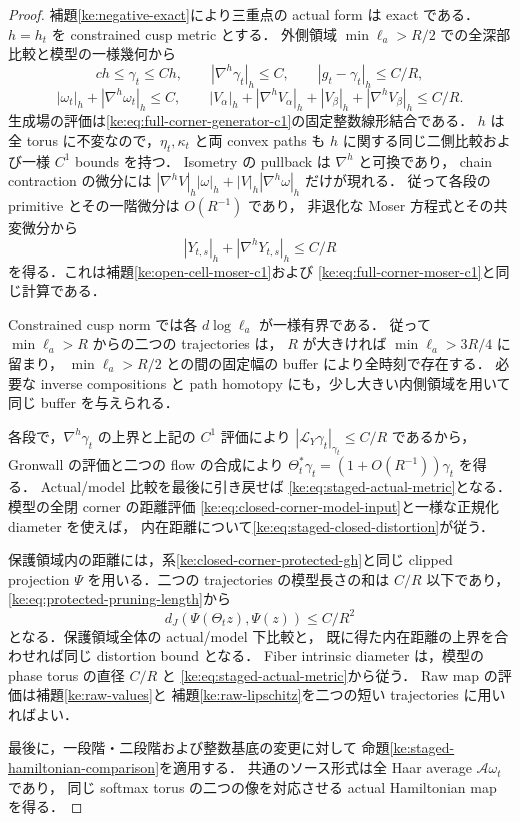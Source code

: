 \begin{proof}
補題\ref{ke:negative-exact}により三重点の actual form は exact である．
$h=h_t$ を constrained cusp metric とする．
外側領域 $\min\ell_a>R/2$ での全深部比較と模型の一様幾何から
\[
 ch\le\gamma_t\le Ch,\qquad
 |\nabla^h\gamma_t|_h\le C,\qquad |g_t-\gamma_t|_h\le C/R,
\]
\[
 |\omega_t|_h+|\nabla^h\omega_t|_h\le C,\qquad
 |V_\alpha|_h+|\nabla^hV_\alpha|_h
 +|V_\beta|_h+|\nabla^hV_\beta|_h
 \le C/R.
\]
生成場の評価は\eqref{ke:eq:full-corner-generator-c1}の固定整数線形結合である．
$h$ は全 torus に不変なので，$\eta_t,\kappa_t$ と両 convex paths も
$h$ に関する同じ二側比較および一様 $C^1$ bounds を持つ．
Isometry の pullback は $\nabla^h$ と可換であり，
chain contraction の微分には
$|\nabla^hV|_h|\omega|_h+|V|_h|\nabla^h\omega|_h$ だけが現れる．
従って各段の primitive とその一階微分は $O(R^{-1})$ であり，
非退化な Moser 方程式とその共変微分から
\[
 |Y_{t,s}|_h+|\nabla^hY_{t,s}|_h
 \le C/R
\]
を得る．これは補題\ref{ke:open-cell-moser-c1}および
\eqref{ke:eq:full-corner-moser-c1}と同じ計算である．

Constrained cusp norm では各 $d\log\ell_a$ が一様有界である．
従って $\min\ell_a>R$ からの二つの trajectories は，
$R$ が大きければ $\min\ell_a>3R/4$ に留まり，
$\min\ell_a>R/2$ との間の固定幅の buffer により全時刻で存在する．
必要な inverse compositions と path homotopy にも，少し大きい内側領域を用いて
同じ buffer を与えられる．

各段で，$\nabla^h\gamma_t$ の上界と上記の $C^1$ 評価により
$|\mathcal L_Y\gamma_t|_{\gamma_t}\le C/R$ であるから，
Gronwall の評価と二つの flow の合成により
$\Theta_t^*\gamma_t=(1+O(R^{-1}))\gamma_t$ を得る．
Actual/model 比較を最後に引き戻せば
\eqref{ke:eq:staged-actual-metric}となる．
模型の全閉 corner の距離評価
\eqref{ke:eq:closed-corner-model-input}と一様な正規化 diameter を使えば，
内在距離について\eqref{ke:eq:staged-closed-distortion}が従う．

保護領域内の距離には，系\ref{ke:closed-corner-protected-gh}と同じ
clipped projection $\Psi$ を用いる．二つの trajectories の模型長さの和は $C/R$ 以下であり，
\eqref{ke:eq:protected-pruning-length}から
\[
 d_J(\Psi(\Theta_tz),\Psi(z))\le C/R^2
\]
となる．保護領域全体の actual/model 下比較と，
既に得た内在距離の上界を合わせれば同じ distortion bound となる．
Fiber intrinsic diameter は，模型の phase torus の直径 $C/R$ と
\eqref{ke:eq:staged-actual-metric}から従う．
Raw map の評価は補題\ref{ke:raw-values}と
補題\ref{ke:raw-lipschitz}を二つの短い trajectories に用いればよい．

最後に，一段階・二段階および整数基底の変更に対して
命題\ref{ke:staged-hamiltonian-comparison}を適用する．
共通のソース形式は全 Haar average $\mathcal A\omega_t$ であり，
同じ softmax torus の二つの像を対応させる actual Hamiltonian map を得る．
\end{proof}

